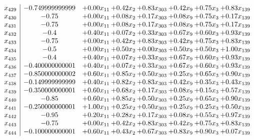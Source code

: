 \documentclass[8pt]{article}
\begin{document}
\[\begin{array}{c| c c@{\hskip 2pt} c@{\hskip 2pt} c@{\hskip 2pt} c@{\hskip 2pt} c@{\hskip 2pt} c@{\hskip 2pt} }
 x_{429}   &  -0.749999999999 & +  0.00 x_{11} & +  0.42 x_{2} & +  0.83 x_{303} & +  0.42 x_{9} & +  0.75 x_{3} & +  0.83 x_{139}\\
 x_{430}   &  -0.75 & +  0.00 x_{11} & +  0.08 x_{2} & +  0.17 x_{303} & +  0.08 x_{9} & +  0.75 x_{3} & +  0.17 x_{139}\\
 x_{431}   &  -0.75 & +  0.00 x_{11} & +  0.08 x_{2} & +  0.17 x_{303} & +  0.08 x_{9} & +  0.75 x_{3} & +  0.17 x_{139}\\
 x_{432}   &  -0.4 & +  0.40 x_{11} & +  0.07 x_{2} & +  0.33 x_{303} & +  0.67 x_{9} & +  0.60 x_{3} & +  0.93 x_{139}\\
 x_{433}   &  -0.75 & +  0.00 x_{11} & +  0.42 x_{2} & +  0.83 x_{303} & +  0.42 x_{9} & +  0.75 x_{3} & +  0.83 x_{139}\\
 x_{434}   &  -0.5 & +  0.00 x_{11} & +  0.50 x_{2} & +  0.00 x_{303} & +  0.50 x_{9} & +  0.50 x_{3} & +  1.00 x_{139}\\
 x_{435}   &  -0.4 & +  0.40 x_{11} & +  0.07 x_{2} & +  0.33 x_{303} & +  0.67 x_{9} & +  0.60 x_{3} & +  0.93 x_{139}\\
 x_{436}   &  -0.400000000001 & +  0.40 x_{11} & +  0.07 x_{2} & +  0.33 x_{303} & +  0.67 x_{9} & +  0.60 x_{3} & +  0.93 x_{139}\\
 x_{437}   &  -0.850000000002 & +  0.60 x_{11} & +  0.85 x_{2} & +  0.50 x_{303} & +  0.25 x_{9} & +  0.65 x_{3} & +  0.90 x_{139}\\
 x_{438}   &  -0.149999999999 & +  0.40 x_{11} & +  0.82 x_{2} & +  0.83 x_{303} & +  0.42 x_{9} & +  0.35 x_{3} & +  0.43 x_{139}\\
 x_{439}   &  -0.350000000001 & +  0.60 x_{11} & +  0.68 x_{2} & +  0.17 x_{303} & +  0.08 x_{9} & +  0.15 x_{3} & +  0.57 x_{139}\\
 x_{440}   &  -0.85 & +  0.60 x_{11} & +  0.85 x_{2} & +  0.50 x_{303} & +  0.25 x_{9} & +  0.65 x_{3} & +  0.90 x_{139}\\
 x_{441}   &  -0.250000000001 & +  1.00 x_{11} & +  0.25 x_{2} & +  0.50 x_{303} & +  0.25 x_{9} & +  0.25 x_{3} & +  0.50 x_{139}\\
 x_{442}   &  -0.95 & +  0.20 x_{11} & +  0.28 x_{2} & +  0.17 x_{303} & +  0.08 x_{9} & +  0.55 x_{3} & +  0.97 x_{139}\\
 x_{443}   &  -0.75 & +  0.00 x_{11} & +  0.42 x_{2} & +  0.83 x_{303} & +  0.42 x_{9} & +  0.75 x_{3} & +  0.83 x_{139}\\
 x_{444}   &  -0.100000000001 & +  0.60 x_{11} & +  0.43 x_{2} & +  0.67 x_{303} & +  0.83 x_{9} & +  0.90 x_{3} & +  0.07 x_{139}\\

\end{array}\]
\end{document}
